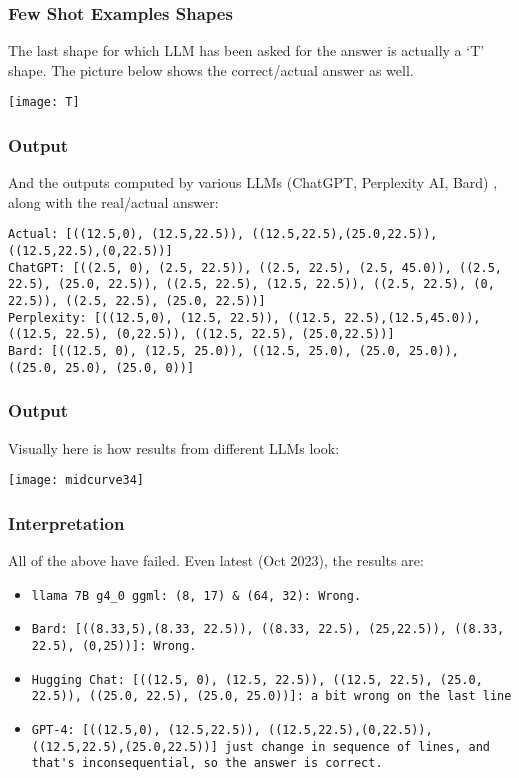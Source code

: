 \begin{frame}[fragile]\frametitle{Few Shot Examples Shapes}
The last shape for which LLM has been asked for the answer is actually a ‘T’ shape. The picture below shows the correct/actual answer as well.

\begin{center}
\texttt{[image: T]}
\end{center}	
\end{frame}

\begin{frame}[fragile]\frametitle{Output}
And the outputs computed by various LLMs (ChatGPT, Perplexity AI, Bard) , along with the real/actual answer:

\begin{lstlisting}
Actual: [((12.5,0), (12.5,22.5)), ((12.5,22.5),(25.0,22.5)), ((12.5,22.5),(0,22.5))]
ChatGPT: [((2.5, 0), (2.5, 22.5)), ((2.5, 22.5), (2.5, 45.0)), ((2.5, 22.5), (25.0, 22.5)), ((2.5, 22.5), (12.5, 22.5)), ((2.5, 22.5), (0, 22.5)), ((2.5, 22.5), (25.0, 22.5))]
Perplexity: [((12.5,0), (12.5, 22.5)), ((12.5, 22.5),(12.5,45.0)), ((12.5, 22.5), (0,22.5)), ((12.5, 22.5), (25.0,22.5))]
Bard: [((12.5, 0), (12.5, 25.0)), ((12.5, 25.0), (25.0, 25.0)), ((25.0, 25.0), (25.0, 0))]
\end{lstlisting}	
\end{frame}

\begin{frame}[fragile]\frametitle{Output}

Visually here is how results from different LLMs look:

\begin{center}
\texttt{[image: midcurve34]}
\end{center}	
\end{frame}

\begin{frame}[fragile]\frametitle{Interpretation}

All of the above have failed. Even latest (Oct 2023), the results are:
\begin{itemize}
\item \lstinline|llama 7B g4_0 ggml: (8, 17) & (64, 32): Wrong.|
\item \lstinline|Bard: [((8.33,5),(8.33, 22.5)), ((8.33, 22.5), (25,22.5)), ((8.33, 22.5), (0,25))]: Wrong.|
\item \lstinline|Hugging Chat: [((12.5, 0), (12.5, 22.5)), ((12.5, 22.5), (25.0, 22.5)), ((25.0, 22.5), (25.0, 25.0))]: a bit wrong on the last line|
\item \lstinline|GPT-4: [((12.5,0), (12.5,22.5)), ((12.5,22.5),(0,22.5)), ((12.5,22.5),(25.0,22.5))] just change in sequence of lines, and that's inconsequential, so the answer is correct.|
\end{itemize}	
\end{frame}


